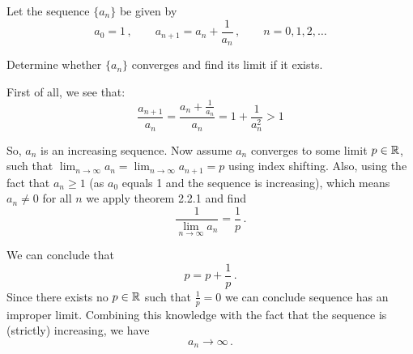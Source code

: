 \documentclass[week=3]{homework}
\begin{document}
\begin{questions}
	    \question Let the sequence $\{a_n\}$ be given by
	    \[
		    a_0 = 1\,, \qquad a_{n+1} = a_n + \frac{1}{a_n}\,, \qquad n = 0,1,2,\ldots
	    \]
	    
	    Determine whether $\{a_n\}$ converges and find its limit if it exists.
	    
	    First of all, we see that:
	    \[
		    \frac{a_{n+1}}{a_n} = \frac{a_n + \frac{1}{a_n}}{a_n} = 1 + \frac{1}{a_n^2} > 1
	    \]
	    
	    So, $a_n$ is an increasing sequence. 
	    Now assume $a_n$ converges to some limit $p \in \mathbb{R}$, such that $\lim_{n\to\infty}a_{n} = \lim_{n\to\infty}a_{n+1} = p$ using index shifting. Also, using the fact that $a_n \geq 1$ (as $a_0$ equals 1 and the sequence is increasing), which means $a_n \neq 0$ for all $n$ we apply theorem 2.2.1 and find
	    \[
		    \frac{1}{\lim_{n\to\infty}a_n} = \frac{1}{p}\,.
	    \]
	    
	    We can conclude that
	    \[
		    p = p + \frac{1}{p}\,.
	    \]
	    Since there exists no $p \in \mathbb{R}$ such that $\frac{1}{p} = 0$ we can conclude sequence has an improper limit. Combining this knowledge with the fact that the sequence is (strictly) increasing, we have
	    \[
		    a_n \to \infty\,.
	    \]
     \end{questions}
\end{document}
